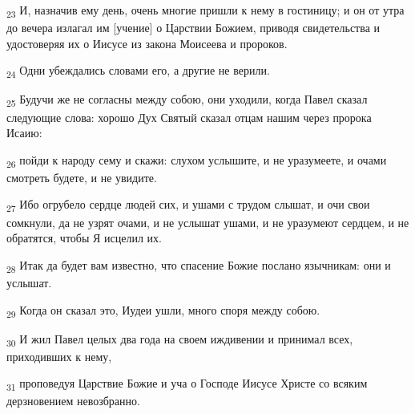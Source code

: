 \begin{tcolorbox}
\textsubscript{23} И, назначив ему день, очень многие пришли к нему в гостиницу; и он от утра до вечера излагал им [учение] о Царствии Божием, приводя свидетельства и удостоверяя их о Иисусе из закона Моисеева и пророков.
\end{tcolorbox}
\begin{tcolorbox}
\textsubscript{24} Одни убеждались словами его, а другие не верили.
\end{tcolorbox}
\begin{tcolorbox}
\textsubscript{25} Будучи же не согласны между собою, они уходили, когда Павел сказал следующие слова: хорошо Дух Святый сказал отцам нашим через пророка Исаию:
\end{tcolorbox}
\begin{tcolorbox}
\textsubscript{26} пойди к народу сему и скажи: слухом услышите, и не уразумеете, и очами смотреть будете, и не увидите.
\end{tcolorbox}
\begin{tcolorbox}
\textsubscript{27} Ибо огрубело сердце людей сих, и ушами с трудом слышат, и очи свои сомкнули, да не узрят очами, и не услышат ушами, и не уразумеют сердцем, и не обратятся, чтобы Я исцелил их.
\end{tcolorbox}
\begin{tcolorbox}
\textsubscript{28} Итак да будет вам известно, что спасение Божие послано язычникам: они и услышат.
\end{tcolorbox}
\begin{tcolorbox}
\textsubscript{29} Когда он сказал это, Иудеи ушли, много споря между собою.
\end{tcolorbox}
\begin{tcolorbox}
\textsubscript{30} И жил Павел целых два года на своем иждивении и принимал всех, приходивших к нему,
\end{tcolorbox}
\begin{tcolorbox}
\textsubscript{31} проповедуя Царствие Божие и уча о Господе Иисусе Христе со всяким дерзновением невозбранно.
\end{tcolorbox}
